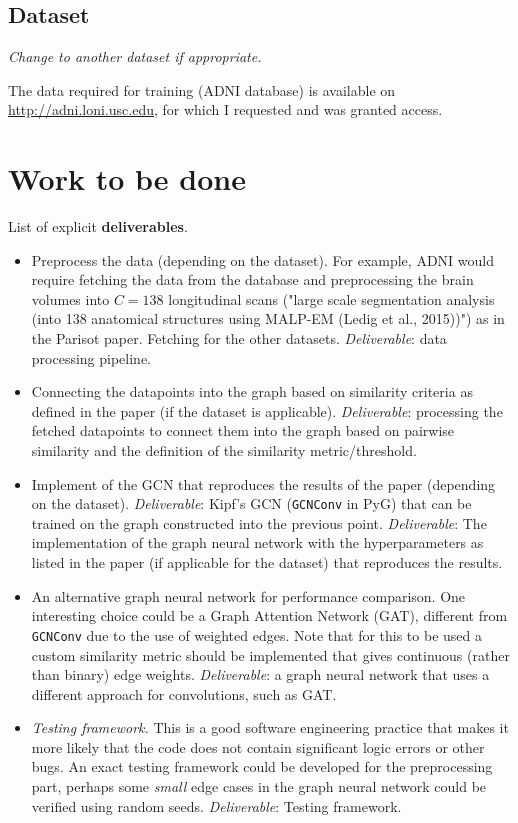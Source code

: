 \documentclass[12pt,a4paper,twoside]{article}
\begin{document}
\subsection*{Dataset}
\textit{Change to another dataset if appropriate.}

The data required for training (ADNI database) is available on \url{http://adni.loni.usc.edu}, for which I requested and was granted access.

\section*{Work to be done}
\label{section:work}

List of explicit \textbf{deliverables}.
\begin{itemize}
  \item Preprocess the data (depending on the dataset). For example, ADNI would require fetching the data from the database and preprocessing the brain volumes into $C=138$ longitudinal scans ("large scale segmentation analysis (into 138 anatomical structures using MALP-EM (Ledig et al., 2015))") as in the Parisot paper. Fetching for the other datasets. \textit{Deliverable}: data processing pipeline.
  \item Connecting the datapoints into the graph based on similarity criteria as defined in the paper (if the dataset is applicable). \textit{Deliverable}: processing the fetched datapoints to connect them into the graph based on pairwise similarity and the definition of the similarity metric/threshold.
  \item Implement of the GCN that reproduces the results of the paper (depending on the dataset). \textit{Deliverable}: Kipf's GCN (\texttt{GCNConv} in PyG) that can be trained on the graph constructed into the previous point. \textit{Deliverable}: The implementation of the graph neural network with the hyperparameters as listed in the paper (if applicable for the dataset) that reproduces the results.
  \item An alternative graph neural network for performance comparison. One interesting choice could be a Graph Attention Network (GAT), different from \texttt{GCNConv} due to the use of weighted edges. Note that for this to be used a custom similarity metric should be implemented that gives continuous (rather than binary) edge weights. \textit{Deliverable}: a graph neural network that uses a different approach for convolutions, such as GAT.
  \item \textit{Testing framework.} This is a good software engineering practice that makes it more likely that the code does not contain significant logic errors or other bugs. An exact testing framework could be developed for the preprocessing part, perhaps some \textit{small} edge cases in the graph neural network could be verified using random seeds. \textit{Deliverable}: Testing framework.

\end{itemize}
\end{document}
